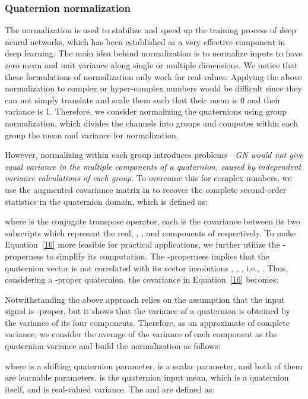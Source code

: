 \documentclass[lettersize,journal]{IEEEtran}
\begin{document}
\subsubsection{Quaternion normalization}
The normalization\cite{RN69, RN70} is used to stabilize and speed up the training process of deep neural networks, which has been established as a very effective component in deep learning. The main idea behind normalization is to normalize inputs to have zero mean and unit variance along single or multiple dimensions. We notice that these formulations of normalization only work for real-values. Applying the above normalization to complex or hyper-complex numbers would be difficult since they can not simply translate and scale them such that their mean is 0 and their variance is 1. Therefore, we consider normalizing the quaternions using group normalization\cite{RN69}, which divides the channels into groups and computes within each group the mean and variance for normalization. 

However, normalizing within each group introduces problems—\textit{GN would not give equal variance in the multiple components of a quaternion, caused by independent variance calculations of each group}. To overcome this for complex numbers, we use the augmented covariance matrix in\cite{RN68} to recover the complete second-order statistics in the quaternion domain, which is defined as: 




\noindent where  is the conjugate transpose operator, each  is the covariance between its two subscripts which represent the real, , , and  components of  respectively. To make Equation~\ref{16} more feasible for practical applications, we further utilize the -properness\cite{RN65} to simplify its computation. The -properness implies that the quaternion vector  is not correlated with its vector involutions , , , i.e., . 
Thus, considering a -proper quaternion, the covariance in Equation~\ref{16} becomes: 


Notwithstanding the above approach relies on the assumption that the input signal is -proper, but it shows that the variance of a quaternion is obtained by the variance of its four components. Therefore, as an approximate of complete variance, we consider the average of the variance of each component as the quaternion variance and build the normalization as follows:

where  is a shifting quaternion parameter,  is a scalar parameter, and both of them are learnable parameters.  is the quaternion input mean, which is a quaternion itself, and  is real-valued variance. The   and  are defined as:
\end{document}
